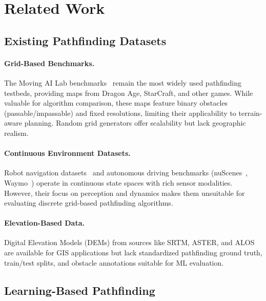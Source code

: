 \documentclass{article}
\begin{document}
\section{Related Work}
\label{sec:related}

\subsection{Existing Pathfinding Datasets}

\paragraph{Grid-Based Benchmarks.}
The Moving AI Lab benchmarks~\cite{sturtevant2012benchmarks} remain the most widely used pathfinding testbeds, providing maps from Dragon Age, StarCraft, and other games. While valuable for algorithm comparison, these maps feature binary obstacles (passable/impassable) and fixed resolutions, limiting their applicability to terrain-aware planning. Random grid generators offer scalability but lack geographic realism.

\paragraph{Continuous Environment Datasets.}
Robot navigation datasets~\cite{mirowski2017learning} and autonomous driving benchmarks (nuScenes~\cite{caesar2020nuscenes}, Waymo~\cite{sun2020waymo}) operate in continuous state spaces with rich sensor modalities. However, their focus on perception and dynamics makes them unsuitable for evaluating discrete grid-based pathfinding algorithms.

\paragraph{Elevation-Based Data.}
Digital Elevation Models (DEMs) from sources like SRTM, ASTER, and ALOS are available for GIS applications but lack standardized pathfinding ground truth, train/test splits, and obstacle annotations suitable for ML evaluation.

\subsection{Learning-Based Pathfinding}
\end{document}
